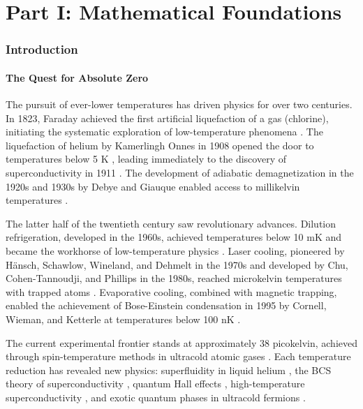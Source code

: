 \documentclass[twocolumn,10pt,twoside]{article}
\begin{document}

\part*{Part I: Mathematical Foundations}

\section{Introduction}

\subsection{The Quest for Absolute Zero}

The pursuit of ever-lower temperatures has driven physics for over two centuries. In 1823, Faraday achieved the first artificial liquefaction of a gas (chlorine), initiating the systematic exploration of low-temperature phenomena \cite{faraday1823}. The liquefaction of helium by Kamerlingh Onnes in 1908 opened the door to temperatures below 5 K \cite{onnes1908}, leading immediately to the discovery of superconductivity in 1911 \cite{onnes1911}. The development of adiabatic demagnetization in the 1920s and 1930s by Debye and Giauque enabled access to millikelvin temperatures \cite{debye1926,giauque1927}.

The latter half of the twentieth century saw revolutionary advances. Dilution refrigeration, developed in the 1960s, achieved temperatures below 10 mK and became the workhorse of low-temperature physics \cite{london1951,das1965}. Laser cooling, pioneered by H\"{a}nsch, Schawlow, Wineland, and Dehmelt in the 1970s and developed by Chu, Cohen-Tannoudji, and Phillips in the 1980s, reached microkelvin temperatures with trapped atoms \cite{hansch1975,wineland1978,chu1985,phillips1985}. Evaporative cooling, combined with magnetic trapping, enabled the achievement of Bose-Einstein condensation in 1995 by Cornell, Wieman, and Ketterle at temperatures below 100 nK \cite{anderson1995,davis1995,ketterle1996}.

The current experimental frontier stands at approximately 38 picokelvin, achieved through spin-temperature methods in ultracold atomic gases \cite{medley2011}. Each temperature reduction has revealed new physics: superfluidity in liquid helium \cite{kapitza1938,allen1938}, the BCS theory of superconductivity \cite{bardeen1957}, quantum Hall effects \cite{klitzing1980,tsui1982}, high-temperature superconductivity \cite{bednorz1986}, and exotic quantum phases in ultracold fermions \cite{demarco1999,regal2004,zwierlein2005}.
\end{document}
